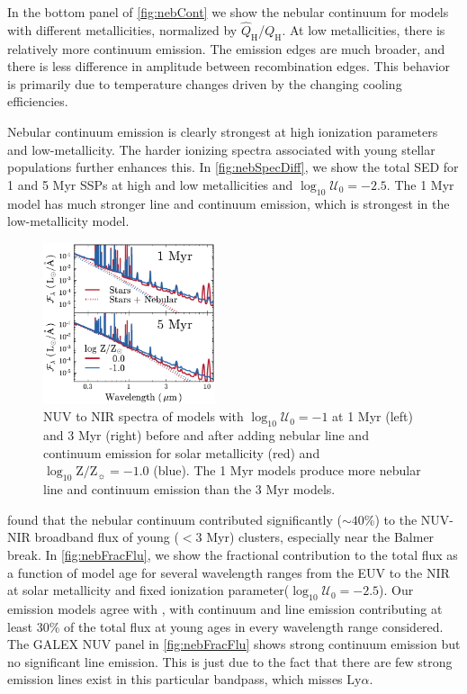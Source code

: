 \documentclass[linenumbers, trackchanges, tighten]{aastex61}%
\newcommand{\Fig}[1]{\autoref{fig:#1}}
\newcommand{\logten}{\ensuremath{\log_{10}}}
\newcommand{\Lya}{\ensuremath{\mathrm{Ly}\alpha}}
\newcommand{\logZeq}[1]{\ensuremath{\logten \mathrm{Z}/\mathrm{Z}_{\sun} = #1}}
\newcommand{\QH}{\ensuremath{Q_{\mathrm{H}}}}
\newcommand{\QHat}{\ensuremath{\hat{Q}_{\mathrm{H}}}}
\newcommand{\logU}{\ensuremath{\logten \mathcal{U}_0}}
\begin{document}
In the bottom panel of \Fig{nebCont} we show the nebular continuum for models with different metallicities, normalized by \QHat{}/\QH{}. At low metallicities, there is relatively more continuum emission. The emission edges are much broader, and there is less difference in amplitude between recombination edges. This behavior is primarily due to temperature changes driven by the changing cooling efficiencies.

Nebular continuum emission is clearly strongest at high ionization parameters and low-metallicity. The harder ionizing spectra associated with young stellar populations further enhances this. In \Fig{nebSpecDiff}, we show the total SED for 1 and 5 Myr SSPs at high and low metallicities and $\logU =-2.5$. The 1 Myr model has much stronger line and continuum emission, which is strongest in the low-metallicity model.

\begin{figure}[!htbp]
  \begin{centering}
    \includegraphics[width=0.45\textwidth]{f11.pdf}
    \caption{NUV to NIR spectra of models with $\logU=-1$ at 1 Myr (left) and 3 Myr (right) before and after adding nebular line and continuum emission for solar metallicity (red) and \logZeq{-1.0} (blue). The 1 Myr models produce more nebular line and continuum emission than the 3 Myr models.}
    \label{fig:nebSpecDiff}
  \end{centering}
\end{figure}

\citet{Reines10} found that the nebular continuum contributed significantly ($\sim40$\%) to the NUV-NIR broadband flux of young ($<3$ Myr) clusters, especially near the Balmer break. In \Fig{nebFracFlu}, we show the fractional contribution to the total flux as a function of model age for several wavelength ranges from the EUV to the NIR at solar metallicity and fixed ionization parameter($\logU=-2.5$). Our emission models agree with \citet{Reines10}, with continuum and line emission contributing at least 30\% of the total flux at young ages in every wavelength range considered. The GALEX NUV panel in \Fig{nebFracFlu} shows strong continuum emission but no significant line emission. This is just due to the fact that there are few strong emission lines exist in this particular bandpass, which misses \Lya.
\end{document}
